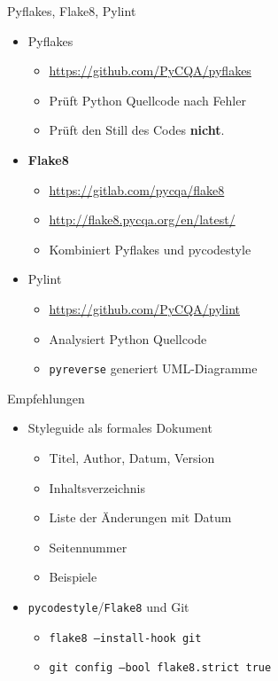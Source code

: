 \documentclass{beamer}
\begin{document}
\begin{frame}{Pyflakes, Flake8, Pylint}
  \begin{itemize}
    \item Pyflakes
      \begin{itemize}
        \item \url{https://github.com/PyCQA/pyflakes}
        \item Prüft Python Quellcode nach Fehler
        \item Prüft den Still des Codes \textbf{nicht}.
      \end{itemize}
    \item \textbf{Flake8}
      \begin{itemize}
        \item \url{https://gitlab.com/pycqa/flake8}
        \item \url{http://flake8.pycqa.org/en/latest/}
        \item Kombiniert Pyflakes und pycodestyle
      \end{itemize}
    \item Pylint
      \begin{itemize}
        \item \url{https://github.com/PyCQA/pylint}
        \item Analysiert Python Quellcode
        \item \texttt{pyreverse} generiert UML-Diagramme
      \end{itemize}
  \end{itemize}
\end{frame}

\begin{frame}{Empfehlungen}
\begin{itemize}
  \item Styleguide als formales Dokument
  \begin{itemize}
    \item Titel, Author, Datum, Version
    \item Inhaltsverzeichnis
    \item Liste der Änderungen mit Datum
    \item Seitennummer
    \item Beispiele
  \end{itemize}
  \item \texttt{pycodestyle}/\texttt{Flake8} und Git
  \begin{itemize}
    \item \texttt{flake8 --install-hook git}
    \item \texttt{git config --bool flake8.strict true}
  \end{itemize}
\end{itemize}
\end{frame}
\end{document}

